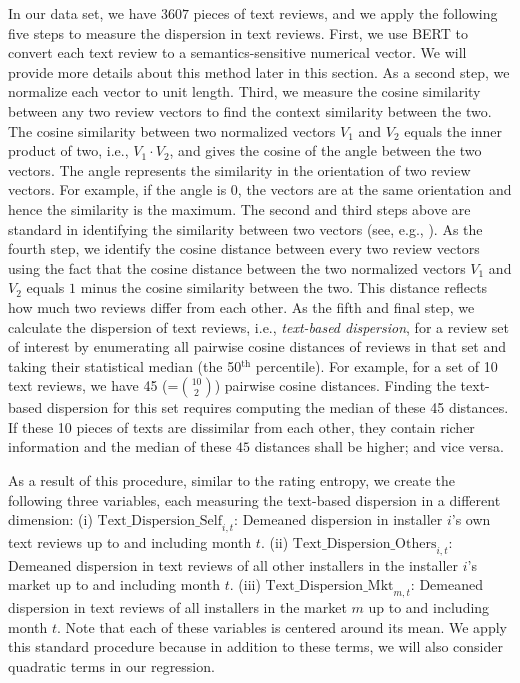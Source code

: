 \documentclass[msom,blindrev]{informs3}
\begin{document}
In our data set, we have $3607$ pieces of text reviews, and we apply the following five steps to measure the dispersion in text reviews. First, we use BERT to convert each text review to a semantics-sensitive numerical vector. We will provide more details about this method later in this section.  As a second step, we normalize each vector to unit length. Third, we measure the cosine similarity between any two review vectors to find the context similarity between the two. The cosine similarity between two normalized vectors $V_{1}$ and $V_{2}$ equals the inner product of two, i.e., $V_1 \cdot V_2$, and gives the cosine of the angle between the two vectors. The angle represents the similarity in the orientation of two review vectors. For example, if the angle is $0$, the vectors are at the same orientation and hence the similarity is the maximum. The second and third steps above are standard in identifying the similarity between two vectors (see, e.g., \cite{hoberg2016text}). As the fourth step, we identify the cosine distance between every two review vectors using the fact that the cosine distance between the two normalized vectors $V_{1}$ and $V_{2}$ equals $1$ minus the cosine similarity between the two. This distance reflects how much two reviews differ from each other. As the fifth and final step, we calculate the dispersion of text reviews, i.e., \emph{text-based dispersion}, for a review set of interest by enumerating all pairwise cosine distances of reviews in that set and taking their statistical median (the 50$^{\text{th}}$ percentile). For example, for a set of 10 text reviews, we have 45 (=$\binom{10}{2}$) pairwise cosine distances. Finding the text-based dispersion for this set requires computing the median of these 45 distances. If these 10 pieces of texts are dissimilar from each other, they contain richer information and the median of these $45$ distances shall be higher; and vice versa.

 As a result of this procedure, similar to the rating entropy, we create the following three variables, each measuring the text-based dispersion in a different dimension: (i) $\text{Text\_Dispersion\_Self}_{i,t}$: Demeaned dispersion in installer $i$'s own text reviews up to and including month $t$. %
(ii) $\text{Text\_Dispersion\_Others}_{i,t}$: Demeaned dispersion in text reviews of all other installers in the installer $i$'s market up to and including month $t$. %
(iii) $\text{Text\_Dispersion\_Mkt}_{m,t}$: Demeaned dispersion in text reviews of all installers in the market $m$ up to and including month $t$. %
Note that each of these variables is centered around its mean. We apply this standard procedure because in addition to these terms, we will also consider quadratic terms in our regression.
\end{document}
